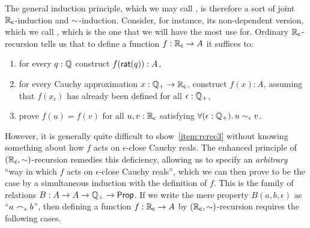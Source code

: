 The general induction principle, which we may call , is therefore a sort of joint $\mathbb{R}_\mathsf{c}$-induction and $\mathord\sim$-induction.
Consider, for instance, its non-dependent version, which we call , which is the one that we will have the most use for.
Ordinary $\mathbb{R}_\mathsf{c}$-recursion tells us that to define a function $f : \mathbb{R}_\mathsf{c} \to A$ it suffices to:
\begin{enumerate}
\item for every $q : \mathbb{Q}$ construct $f(\mathsf{rat}(q)) : A$,
\item for every Cauchy approximation $x : \mathbb{Q}_{+} \to \mathbb{R}_\mathsf{c}$, construct $f(x) : A$,
  assuming that $f(x_\epsilon)$ has already been defined for all $\epsilon : \mathbb{Q}_{+}$,
\item prove $f(u) = f(v)$ for all $u, v : \mathbb{R}_\mathsf{c}$ satisfying $\fall{\epsilon:\Qp} u\close\epsilon v$.\label{item:rcrec3}
\end{enumerate}
However, it is generally quite difficult to show~\ref{item:rcrec3} without knowing something about how $f$ acts on $\epsilon$-close Cauchy reals.
The enhanced principle of $(\mathbb{R}_\mathsf{c},\mathord\sim)$-recursion remedies this deficiency, allowing us to specify an \emph{arbitrary} ``way in which $f$ acts on $\epsilon$-close Cauchy reals'', which we can then prove to be the case by a simultaneous induction with the definition of $f$.
This is the family of relations $B:A\to A\to \mathbb{Q}_{+}\to\mathsf{Prop}$.
If we write the mere property $B(a,b,\epsilon)$ as ``$a \frown_\epsilon b$'', then defining a function $f:\mathbb{R}_\mathsf{c}\to A$ by $(\mathbb{R}_\mathsf{c},\mathord\sim)$-recursion requires the following cases.

